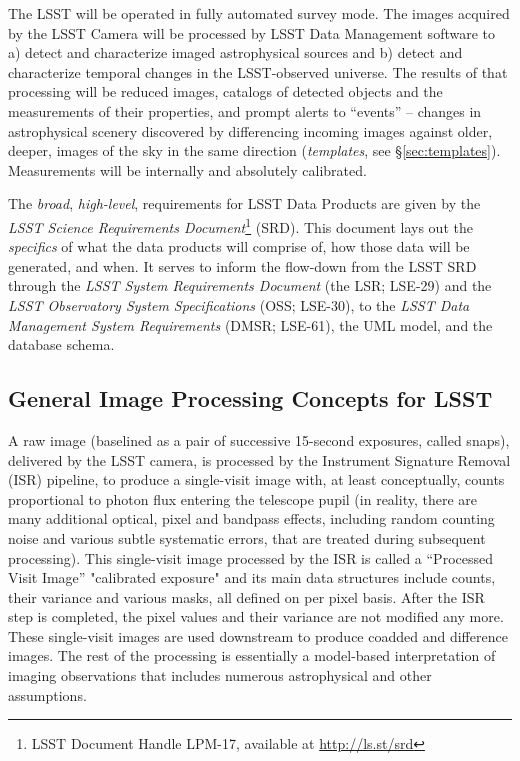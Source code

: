 \documentclass[12pt]{article}
\newcommand{\B}[1]{{\color{blue} #1}}
\newcommand{\R}[1]{{\color{red} #1}}
\begin{document}
The LSST will be operated in fully automated survey mode. The images acquired by the LSST Camera will be processed by LSST Data Management software to a) detect and characterize imaged astrophysical sources and b) detect and characterize temporal changes in the LSST-observed universe. The results of that processing will be reduced images, catalogs of detected objects and the measurements of their properties, and prompt alerts to ``events'' -- changes in astrophysical scenery discovered by differencing incoming images against older, deeper, images of the sky in the same direction ({\em templates}, see \S \ref{sec:templates}). Measurements will be internally and absolutely calibrated.

\vspace{1em}

The {\em broad}, {\em high-level}, requirements for LSST Data Products are given by the {\em LSST Science Requirements Document}\footnote{LSST Document Handle LPM-17\nocite{LPM-17}, available at \url{http://ls.st/srd}} (SRD). This document lays out the {\em specifics} of what the data products will comprise of, how those data will be generated, and when. It serves to inform the flow-down from the LSST SRD through the {\em LSST System Requirements Document} (the LSR; LSE-29\nocite{LSE-29}) and the {\em LSST Observatory System Specifications} (OSS; LSE-30\nocite{LSE-30}), to the {\em LSST Data Management System Requirements} (DMSR; LSE-61\nocite{LSE-61}), the UML model, and the database schema.


\subsection{General Image Processing Concepts for LSST}

 A raw image (baselined as a pair of successive 15-second exposures, called snaps),
delivered by the LSST camera, is processed by the Instrument Signature
Removal (ISR) pipeline, to produce a single-visit image with, at least
conceptually, counts proportional to photon flux entering the
telescope pupil (in reality, there are many additional optical, pixel and
bandpass effects, including random counting noise and various subtle
systematic errors, that are treated during subsequent processing).
This single-visit image processed by the ISR is called a \B{``Processed Visit Image''} \R{"calibrated
exposure"} and its main data structures include counts, their variance and
various masks, all defined on per pixel basis. After the ISR step is
completed, the pixel values and their variance are not modified any more.
These single-visit images are used downstream to produce coadded and difference
images. The rest of the processing is essentially a model-based interpretation
of imaging observations that includes numerous astrophysical and other
assumptions.
\end{document}
